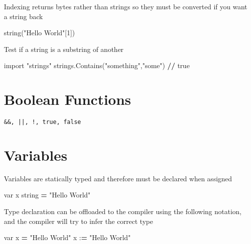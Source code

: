 \documentclass[]{book}
\newenvironment{Shaded}{\begin{snugshade}}{\end{snugshade}}
\newcommand{\DecValTok}[1]{\textcolor[rgb]{0.00,0.00,0.81}{#1}}
\newcommand{\ImportTok}[1]{#1}
\newcommand{\NormalTok}[1]{#1}
\newcommand{\OperatorTok}[1]{\textcolor[rgb]{0.81,0.36,0.00}{\textbf{#1}}}
\newcommand{\StringTok}[1]{\textcolor[rgb]{0.31,0.60,0.02}{#1}}
\begin{document}
Indexing returns bytes rather than strings so they must be converted if you want a string back

\begin{Shaded}
\begin{Highlighting}[]
\NormalTok{string(}\StringTok{"Hello World"}\NormalTok{[}\DecValTok{1}\NormalTok{])}
\end{Highlighting}
\end{Shaded}

Test if a string is a substring of another

\begin{Shaded}
\begin{Highlighting}[]
\ImportTok{import} \StringTok{"strings"}
\NormalTok{strings.Contains(}\StringTok{"something"}\NormalTok{,}\StringTok{"some"}\NormalTok{) }\OperatorTok{//}\NormalTok{ true}
\end{Highlighting}
\end{Shaded}

\hypertarget{boolean-functions}{%
\section{Boolean Functions}\label{boolean-functions}}

\begin{verbatim}
&&, ||, !, true, false
\end{verbatim}

\hypertarget{variables}{%
\section{Variables}\label{variables}}

Variables are statically typed and therefore must be declared when assigned

\begin{Shaded}
\begin{Highlighting}[]
\NormalTok{var x string }\OperatorTok{=} \StringTok{"Hello World"}
\end{Highlighting}
\end{Shaded}

Type declaration can be offloaded to the compiler using the following notation, and the compiler will try to infer the correct type

\begin{Shaded}
\begin{Highlighting}[]
\NormalTok{var x }\OperatorTok{=} \StringTok{"Hello World"}
\NormalTok{x :}\OperatorTok{=} \StringTok{"Hello World"}
\end{Highlighting}
\end{Shaded}
\end{document}
